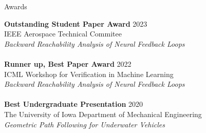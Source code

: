 \begin{rSection}{Awards}

    \textbf{Outstanding Student Paper Award} \hfill 2023 \\
    IEEE Aerospace Technical Commitee \\ \textit{Backward Reachability Analysis of Neural Feedback Loops} \\ \\
    \textbf{Runner up, Best Paper Award} \hfill 2022 \\
    ICML Workshop for Verification in Machine Learning \\ \textit{Backward Reachability Analysis of Neural Feedback Loops} \\ \\
    \textbf{Best Undergraduate Presentation} \hfill 2020 \\
    The University of Iowa Department of Mechanical Engineering \\ \textit{Geometric Path Following for Underwater Vehicles}

\end{rSection}